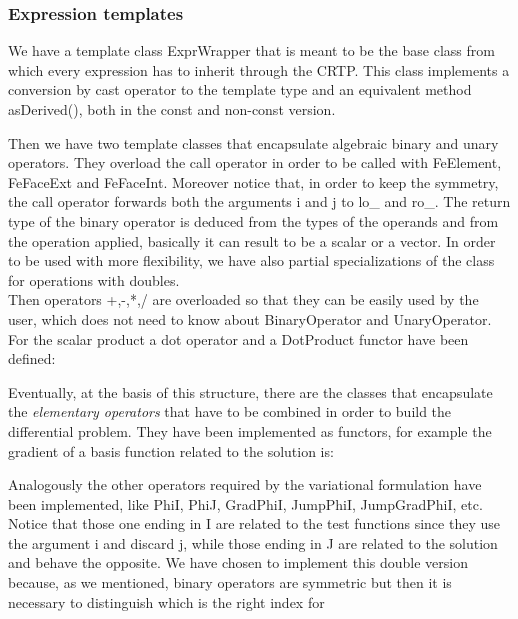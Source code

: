 \documentclass[12pt, a4paper]{article}
\newcommand{\code}[1]{{\footnotesize\ttfamily #1}}
\theoremstyle{definition}
\theoremstyle{plain}
\theoremstyle{plain}
\theoremstyle{definition}
\begin{document}
\subsubsection{Expression templates}

We have a template class \code{ExprWrapper} that is meant to be the base class from which every expression has to inherit through the CRTP. This class implements a conversion by cast operator to the template type and an equivalent method \code{asDerived()}, both in the \code{const} and non-\code{const} version.

Then we have two template classes that encapsulate algebraic binary and unary operators. They overload the call operator in order to be called with \code{FeElement}, \code{FeFaceExt} and \code{FeFaceInt}. Moreover notice that, in order to keep the symmetry, the call operator forwards both the arguments \code{i} and \code{j} to \code{lo\_} and \code{ro\_}. The return type of the binary operator is deduced from the types of the operands and from the operation applied, basically it can result to be a scalar or a vector. In order to be used with more flexibility, we have also partial specializations of the class for operations with \code{double}s.\\
Then operators \code{+,-,*,/} are overloaded so that they can be easily used by 
the user, which does not need to know about \code{BinaryOperator} and 
\code{UnaryOperator}. For the scalar product a \code{dot} operator and a 
\code{DotProduct} functor have been defined:

Eventually, at the basis of this structure, there are the classes that encapsulate the \emph{elementary operators} that have to be combined in order to build the differential problem. They have been implemented as functors, for example the gradient of a basis function related to the solution is:

Analogously the other operators required by the variational formulation have 
been implemented, like \code{PhiI, PhiJ, GradPhiI, JumpPhiI, JumpGradPhiI}, 
etc. Notice that those one ending in \code{I} are related to the test functions since they 
use the argument \code{i} and discard \code{j}, while those ending in \code{J} 
are related to the solution and behave the opposite. We have chosen to 
implement this double version because, as we mentioned, binary operators are 
symmetric but then it is necessary to distinguish which is the right index for 
\end{document}
